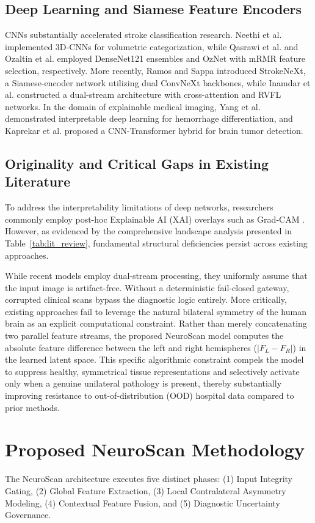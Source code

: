 \documentclass[conference]{IEEEtran}
\begin{document}
\subsection{Deep Learning and Siamese Feature Encoders}
CNNs substantially accelerated stroke classification research. Neethi et al. \cite{b6} implemented 3D-CNNs for volumetric categorization, while Qasrawi et al. \cite{b7} and Ozaltin et al. \cite{b14} employed DenseNet121 ensembles and OzNet with mRMR feature selection, respectively. More recently, Ramos and Sappa \cite{b4} introduced StrokeNeXt, a Siamese-encoder network utilizing dual ConvNeXt backbones, while Inamdar et al. \cite{b3} constructed a dual-stream architecture with cross-attention and RVFL networks. In the domain of explainable medical imaging, Yang et al. \cite{b15} demonstrated interpretable deep learning for hemorrhage differentiation, and Kaprekar et al. \cite{b16} proposed a CNN-Transformer hybrid for brain tumor detection.

\subsection{Originality and Critical Gaps in Existing Literature}
To address the interpretability limitations of deep networks, researchers commonly employ post-hoc Explainable AI (XAI) overlays such as Grad-CAM \cite{b8}. However, as evidenced by the comprehensive landscape analysis presented in Table~\ref{tab:lit_review}, fundamental structural deficiencies persist across existing approaches.

While recent models \cite{b3, b4} employ dual-stream processing, they uniformly assume that the input image is artifact-free. Without a deterministic fail-closed gateway, corrupted clinical scans bypass the diagnostic logic entirely. More critically, existing approaches fail to leverage the natural bilateral symmetry of the human brain as an explicit computational constraint. Rather than merely concatenating two parallel feature streams, the proposed NeuroScan model computes the absolute feature difference between the left and right hemispheres ($|F_L - F_R|$) in the learned latent space. This specific algorithmic constraint compels the model to suppress healthy, symmetrical tissue representations and selectively activate only when a genuine unilateral pathology is present, thereby substantially improving resistance to out-of-distribution (OOD) hospital data compared to prior methods.

\section{Proposed NeuroScan Methodology}
The NeuroScan architecture executes five distinct phases: (1) Input Integrity Gating, (2) Global Feature Extraction, (3) Local Contralateral Asymmetry Modeling, (4) Contextual Feature Fusion, and (5) Diagnostic Uncertainty Governance.
\end{document}
